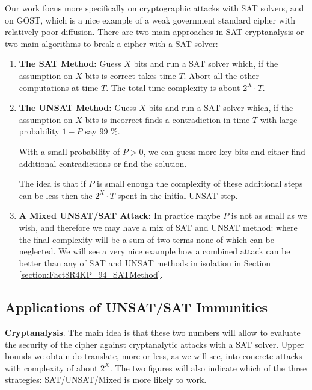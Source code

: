 Our work focus more specifically on cryptographic attacks with SAT solvers, and on GOST, which is a nice example
of a weak government standard cipher with relatively poor diffusion. There are two main approaches in SAT cryptanalysis
or two main algorithms to break a cipher with a SAT solver:

\begin{enumerate}
	\item
	{\bf The SAT Method:}
	Guess $X$ bits and run a SAT solver which,
	if the assumption on $X$ bits is correct takes time $T$.
	Abort all the other computations at time $T$.
	The total time complexity is about $2^{X}\cdot T$.
	\item
	{\bf The UNSAT Method:}
	Guess $X$ bits and run a SAT solver which,
	if the assumption on $X$ bits is incorrect
	finds a contradiction in time $T$
	with large probability $1-P$ say 99 $\%$.
	
	With a small probability of $P>0$,
	we can guess more key bits
	and either find additional contradictions
	or find the solution.
	
	The idea is that if $P$ is small enough the complexity of
	these additional steps can be less then the $2^{X}\cdot T$ spent
	in the initial UNSAT step.
	
	\item
	{\bf A Mixed UNSAT/SAT Attack:}
	In practice maybe $P$ is not as small as we wish, and therefore we may have
	a mix of SAT and UNSAT method:
	where the final complexity will be a sum of two terms none
	of which can be neglected.
	We will see a very nice example
	how a combined attack can be better
	than any of SAT and UNSAT methods in isolation
	in Section \ref{section:Fact8R4KP_94_SATMethod}.
\end{enumerate}

\subsection{Applications of UNSAT/SAT Immunities}
\noindent 
{\bf Cryptanalysis}. %
The main idea is that these two numbers will
allow to evaluate the security of the cipher
against cryptanalytic attacks with a SAT solver.
Upper bounds we obtain do translate, more or less, as we will see,
into concrete attacks with complexity of about $2^{X}$.
The two figures will also indicate which of the three
strategies: SAT/UNSAT/Mixed is more likely to work.

